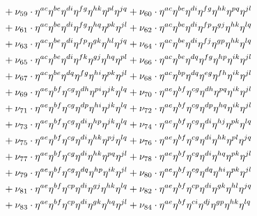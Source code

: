 \documentclass[a4paper,12pt, DIV=14, BCOR=5mm, twoside, headsepline, numbers=noenddot]{scrbook}
\begin{document}
\begin{align}
\begin{alignedat}{2}
& & &\hphantom{=}
+\nu_{59}\cdot\eta^{ac}\eta^{be}\eta^{di}\eta^{fg}\eta^{hk}\eta^{pl}\eta^{jq}+\nu_{60}\cdot\eta^{ac}\eta^{be}\eta^{di}\eta^{fg}\eta^{hk}\eta^{pq}\eta^{jl}\\
& & &\hphantom{=}
+\nu_{61}\cdot\eta^{ac}\eta^{be}\eta^{di}\eta^{fg}\eta^{hq}\eta^{pk}\eta^{jl}+\nu_{62}\cdot\eta^{ac}\eta^{be}\eta^{di}\eta^{fp}\eta^{gj}\eta^{hk}\eta^{lq}\\
& & &\hphantom{=}
+\nu_{63}\cdot\eta^{ac}\eta^{be}\eta^{di}\eta^{fp}\eta^{gk}\eta^{hl}\eta^{jq}+\nu_{64}\cdot\eta^{ac}\eta^{be}\eta^{di}\eta^{fj}\eta^{gp}\eta^{hk}\eta^{lq}\\
& & &\hphantom{=}
+\nu_{65}\cdot\eta^{ac}\eta^{be}\eta^{di}\eta^{fk}\eta^{gj}\eta^{hq}\eta^{pl}+\nu_{66}\cdot\eta^{ac}\eta^{be}\eta^{dq}\eta^{fg}\eta^{hp}\eta^{ik}\eta^{jl}\\
& & &\hphantom{=}
+\nu_{67}\cdot\eta^{ac}\eta^{be}\eta^{dq}\eta^{fg}\eta^{hi}\eta^{pk}\eta^{jl}+\nu_{68}\cdot\eta^{ac}\eta^{bp}\eta^{dq}\eta^{eg}\eta^{fh}\eta^{ik}\eta^{jl}\\
& & &\hphantom{=}
+\nu_{69}\cdot\eta^{ae}\eta^{bf}\eta^{cg}\eta^{dh}\eta^{pi}\eta^{jk}\eta^{lq}+\nu_{70}\cdot\eta^{ae}\eta^{bf}\eta^{cg}\eta^{dh}\eta^{pq}\eta^{ik}\eta^{jl}\\
& & &\hphantom{=}
+\nu_{71}\cdot\eta^{ae}\eta^{bf}\eta^{cg}\eta^{dp}\eta^{hi}\eta^{jk}\eta^{lq}+\nu_{72}\cdot\eta^{ae}\eta^{bf}\eta^{cg}\eta^{dp}\eta^{hq}\eta^{ik}\eta^{jl}\\
& & &\hphantom{=}
+\nu_{73}\cdot\eta^{ae}\eta^{bf}\eta^{cg}\eta^{di}\eta^{hp}\eta^{jk}\eta^{lq}+\nu_{74}\cdot\eta^{ae}\eta^{bf}\eta^{cg}\eta^{di}\eta^{hj}\eta^{pk}\eta^{lq}\\
& & &\hphantom{=}
+\nu_{75}\cdot\eta^{ae}\eta^{bf}\eta^{cg}\eta^{di}\eta^{hk}\eta^{pj}\eta^{lq}+\nu_{76}\cdot\eta^{ae}\eta^{bf}\eta^{cg}\eta^{di}\eta^{hk}\eta^{pl}\eta^{jq}\\
& & &\hphantom{=}
+\nu_{77}\cdot\eta^{ae}\eta^{bf}\eta^{cg}\eta^{di}\eta^{hk}\eta^{pq}\eta^{jl}+\nu_{78}\cdot\eta^{ae}\eta^{bf}\eta^{cg}\eta^{di}\eta^{hq}\eta^{pk}\eta^{jl}\\
& & &\hphantom{=}
+\nu_{79}\cdot\eta^{ae}\eta^{bf}\eta^{cg}\eta^{dq}\eta^{hp}\eta^{ik}\eta^{jl}+\nu_{80}\cdot\eta^{ae}\eta^{bf}\eta^{cg}\eta^{dq}\eta^{hi}\eta^{pk}\eta^{jl}\\
& & &\hphantom{=}
+\nu_{81}\cdot\eta^{ae}\eta^{bf}\eta^{cp}\eta^{di}\eta^{gj}\eta^{hk}\eta^{lq}+\nu_{82}\cdot\eta^{ae}\eta^{bf}\eta^{cp}\eta^{di}\eta^{gk}\eta^{hl}\eta^{jq}\\
& & &\hphantom{=}
+\nu_{83}\cdot\eta^{ae}\eta^{bf}\eta^{cp}\eta^{di}\eta^{gk}\eta^{hq}\eta^{jl}+\nu_{84}\cdot\eta^{ae}\eta^{bf}\eta^{ci}\eta^{dj}\eta^{gp}\eta^{hk}\eta^{lq}\\

\end{alignedat}
\end{align}
\end{document}
